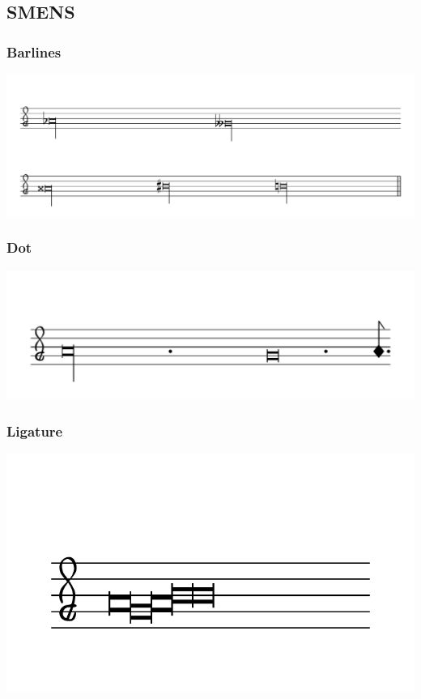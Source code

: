 \documentclass{article}
\begin{document}
\subsection{SMENS}
    \subsubsection{Barlines}


        \includegraphics[scale=0.4]{figures_tests/pdf/smens/barlines1.pdf}

    \subsubsection{Dot}
        \includegraphics[scale=0.5]{figures_tests/pdf/smens/dot1.pdf}

    \subsubsection{Ligature}
        \includegraphics[scale=0.5]{figures_tests/pdf/smens/ligature.pdf}
\end{document}
